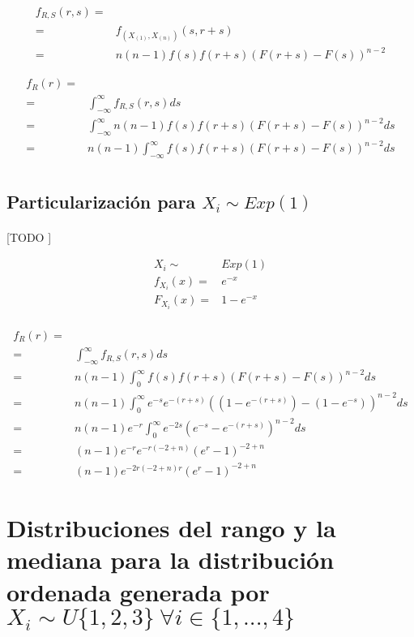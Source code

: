 \documentclass{article}
\begin{document}
    \begin{align}
      f_{R,S}(r,s) =& \\
      =& f_{(X_{(1)}, X_{(n)})} (s,r+s) \\
      =& n(n-1)f(s)f(r+s)(F(r+s) - F(s))^{n-2}
    \end{align}

    \begin{align}
      f_{R} (r) =& \\
      =& \int_{-\infty}^{\infty} f_{R,S}(r,s) ds \\
      =& \int_{-\infty}^{\infty} n(n-1)f(s)f(r+s)(F(r+s) - F(s))^{n-2} ds \\
      =& n(n-1)\int_{-\infty}^{\infty} f(s)f(r+s)(F(r+s) - F(s))^{n-2} ds \\
    \end{align}
    \subsection{Particularización para $X_i \sim Exp(1)$}

      \paragraph{}
      [TODO ]

      \begin{align*}
        X_i \sim& Exp(1)\\
        f_{X_{i}}(x) =& e^{-x}\\
        F_{X_{i}}(x) =& 1-e^{-x} \\
      \end{align*}

      \begin{align}
        f_{R} (r) =&\\
        =& \int_{-\infty}^{\infty} f_{R,S}(r,s) ds \\
        =& n(n-1)\int_{0}^{\infty} f(s)f(r+s)(F(r+s) - F(s))^{n-2} ds \\
        =& n(n-1)\int_{0}^{\infty} e^{-s}e^{-(r+s)}((1-e^{-(r+s)}) - (1-e^{-s}))^{n-2} ds \\
        =& n(n-1)e^{-r}\int_{0}^{\infty} e^{-2s}( e^{-s} - e^{-(r+s)})^{n-2} ds \\
        =& (n-1)e^{-r}e^{-r(-2 + n)} (e^r -1)^{-2 + n} \\
        =& (n-1)e^{-2r(-2 + n) r} (e^r -1)^{-2 + n}
      \end{align}

  \section{Distribuciones del rango y la mediana para la distribución ordenada generada por $X_i \sim U\{1,2,3\} \ \forall i  \in \{1,...,4\}$}
  \label{sec:e3}
\end{document}
